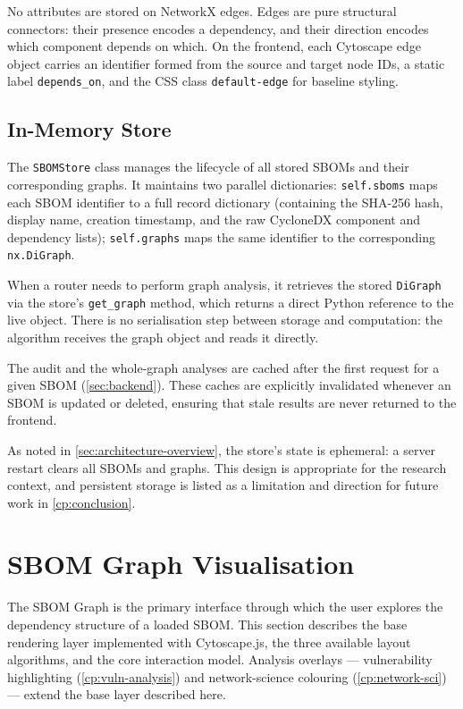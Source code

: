 No attributes are stored on NetworkX edges. Edges are pure structural connectors: their presence encodes a dependency, and their direction encodes which component depends on which. On the frontend, each Cytoscape edge object carries an identifier formed from the source and target node IDs, a static label \texttt{depends\_on}, and the CSS class \texttt{default-edge} for baseline styling.


\subsection{In-Memory Store}
\label{sec:in-memory-store}

The \texttt{SBOMStore} class manages the lifecycle of all stored SBOMs and their corresponding graphs. It maintains two parallel dictionaries: \texttt{self.sboms} maps each SBOM identifier to a full record dictionary (containing the SHA-256 hash, display name, creation timestamp, and the raw CycloneDX component and dependency lists); \texttt{self.graphs} maps the same identifier to the corresponding \texttt{nx.DiGraph}.

When a router needs to perform graph analysis, it retrieves the stored \texttt{DiGraph} via the store's \texttt{get\_graph} method, which returns a direct Python reference to the live object. There is no serialisation step between storage and computation: the algorithm receives the graph object and reads it directly.

The audit and the whole-graph analyses are cached after the first request for a given SBOM (\autoref{sec:backend}). These caches are explicitly invalidated whenever an SBOM is updated or deleted, ensuring that stale results are never returned to the frontend.

As noted in \autoref{sec:architecture-overview}, the store's state is ephemeral: a server restart clears all SBOMs and graphs. This design is appropriate for the research context, and persistent storage is listed as a limitation and direction for future work in \autoref{cp:conclusion}.


\section{SBOM Graph Visualisation}
\label{sec:graph-visualisation}

The SBOM Graph is the primary interface through which the user explores the dependency structure of a loaded SBOM. This section describes the base rendering layer implemented with Cytoscape.js, the three available layout algorithms, and the core interaction model. Analysis overlays --- vulnerability highlighting (\autoref{cp:vuln-analysis}) and network-science colouring (\autoref{cp:network-sci}) --- extend the base layer described here.



